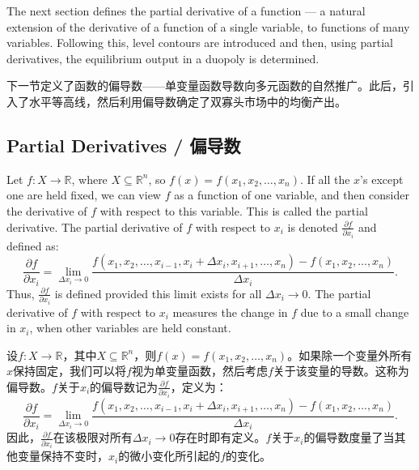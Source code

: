 \begin{original}
The next section defines the partial derivative of a function --- a natural extension of the derivative of a function of a single variable, to functions of many variables. Following this, level contours are introduced and then, using partial derivatives, the equilibrium output in a duopoly is determined.
\end{original}
\begin{translation}
下一节定义了函数的偏导数——单变量函数导数向多元函数的自然推广。此后，引入了水平等高线，然后利用偏导数确定了双寡头市场中的均衡产出。
\end{translation}

\subsection{Partial Derivatives / 偏导数}

\begin{original}
Let $f : X \to \mathbb{R}$, where $X \subseteq \mathbb{R}^n$, so $f(x) = f(x_1, x_2, \dots, x_n)$. If all the $x$'s except one are held fixed, we can view $f$ as a function of one variable, and then consider the derivative of $f$ with respect to this variable. This is called the partial derivative. The partial derivative of $f$ with respect to $x_i$ is denoted $\frac{\partial f}{\partial x_i}$ and defined as:
\[
\frac{\partial f}{\partial x_i} = \lim_{\Delta x_i \to 0} \frac{f(x_1, x_2, \dots, x_{i-1}, x_i + \Delta x_i, x_{i+1}, \dots, x_n) - f(x_1, x_2, \dots, x_n)}{\Delta x_i}.
\]
Thus, $\frac{\partial f}{\partial x_i}$ is defined provided this limit exists for all $\Delta x_i \to 0$. The partial derivative of $f$ with respect to $x_i$ measures the change in $f$ due to a small change in $x_i$, when other variables are held constant.
\end{original}
\begin{translation}
设$f : X \to \mathbb{R}$，其中$X \subseteq \mathbb{R}^n$，则$f(x) = f(x_1, x_2, \dots, x_n)$。如果除一个变量外所有$x$保持固定，我们可以将$f$视为单变量函数，然后考虑$f$关于该变量的导数。这称为偏导数。$f$关于$x_i$的偏导数记为$\frac{\partial f}{\partial x_i}$，定义为：
\[
\frac{\partial f}{\partial x_i} = \lim_{\Delta x_i \to 0} \frac{f(x_1, x_2, \dots, x_{i-1}, x_i + \Delta x_i, x_{i+1}, \dots, x_n) - f(x_1, x_2, \dots, x_n)}{\Delta x_i}.
\]
因此，$\frac{\partial f}{\partial x_i}$在该极限对所有$\Delta x_i \to 0$存在时即有定义。$f$关于$x_i$的偏导数度量了当其他变量保持不变时，$x_i$的微小变化所引起的$f$的变化。
\end{translation}

